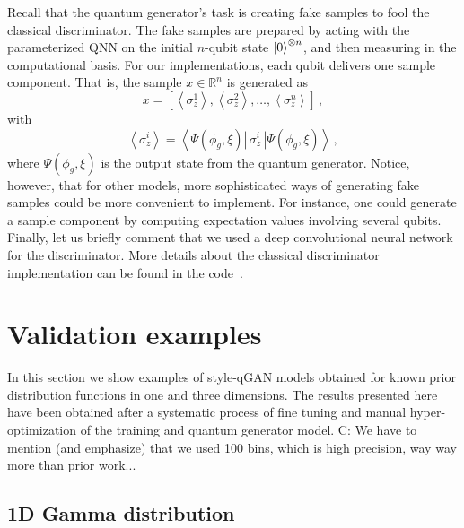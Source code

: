 \documentclass[twocolumn,preprintnumbers,superscriptaddress]{revtex4-2}
\begin{document}
Recall that the quantum generator's task is creating fake samples to fool the classical discriminator. The fake samples are prepared by acting with the parameterized QNN on the initial $n$-qubit state $\ket{0}^{\otimes n}$, and then measuring in the computational basis. For our implementations, each qubit delivers one sample component. That is, the sample $x \in \mathbb{R}^n$ is generated as
\begin{equation}
    \label{eq:samples} x = \left[\left\langle\sigma_z^1\right\rangle,\left\langle\sigma_z^2\right\rangle,\hdots,\left\langle\sigma_z^n\right\rangle\right]\,,
\end{equation}
with
\begin{equation}
    \label{eq:expectation}\left\langle\sigma_z^i\right\rangle = \left\langle\Psi(\phi_g,\xi)\left|\,\sigma_z^i\,\right|\Psi(\phi_g,\xi)\right\rangle \,,
\end{equation}
where $\Psi(\phi_g,\xi)$ is the output state from the quantum generator. Notice, however, that for other models, more sophisticated ways of generating fake samples could be more convenient to implement. For instance, one could generate a sample component by computing expectation values involving several qubits. Finally, let us briefly comment that we used a deep convolutional neural network for the discriminator. More details about the classical discriminator implementation can be found in the code~\cite{cite_code}.

\section{Validation examples}
\label{sec:validation}

In this section we show examples of style-qGAN models obtained for known prior
distribution functions in one and three dimensions. The results presented here
have been obtained after a systematic process of fine tuning and manual
hyper-optimization of the training and quantum generator model. {\color{red} C: We have to mention (and emphasize) that we used 100 bins, which is high precision, way way more than prior work...}

\subsection{1D Gamma distribution}
\label{sec:gamma}
\end{document}
